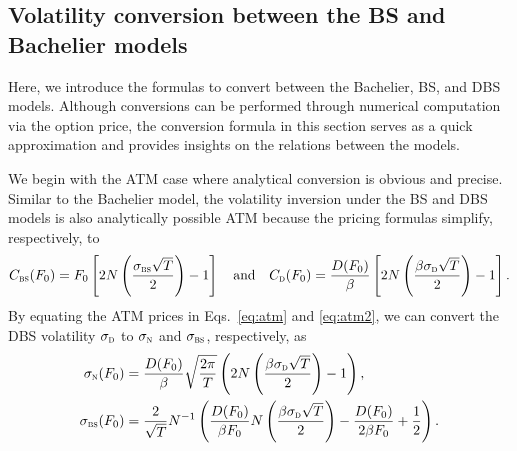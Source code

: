 \documentclass[a4paper,review]{elsarticle}
\newcommand{\qtext}[2][\quad]{#1\text{#2}#1}
\newcommand{\sigman}{\sigma_\textsc{n}}
\newcommand{\sigmad}{\sigma_\textsc{d}}
\newcommand{\sigmabs}{\sigma_\textsc{bs}}
\newcommand{\bs}{\textsc{bs}}
\newcommand{\disp}{\textsc{d}}
\begin{document}
\subsection{Volatility conversion between the BS and Bachelier models} \label{ssec:conversion} \noindent
Here, we introduce the formulas to convert between the Bachelier, BS, and DBS models. Although conversions can be performed through numerical computation via the option price, the conversion formula in this section serves as a quick approximation and provides insights on the relations between the models.

We begin with the ATM case where analytical conversion is obvious and precise. Similar to the Bachelier model, the volatility inversion under the BS and DBS models is also analytically possible ATM because the pricing formulas simplify, respectively, to~\citep[Proposition 3.2]{dimitroff2016lnvsnorm}
\begin{equation} \label{eq:atm2}
C_\bs(F_0) = F_0 \left[ 2 N\left( \frac{\sigmabs\sqrt{T}}{2}\right) -1
\right] \qtext{and}
C_\disp(F_0) = \frac{D(F_0)}{\beta} \left[ 2 N\left( \frac{\beta \sigmad\sqrt{T}}{2}\right) -1
\right].
\end{equation}
By equating the ATM prices in Eqs.~\eqref{eq:atm} and \eqref{eq:atm2}, we can convert the DBS volatility $\sigmad$ to $\sigman$ and $\sigmabs$, respectively, as
\begin{align} 
	\sigman(F_0) &= \frac{D(F_0)}{\beta} \sqrt{\frac{2\pi}{T}} \left( 2 N\left( \frac{\beta \sigmad\sqrt{T}}{2}\right) -1 \right),\label{eq:dbs2n_atm} \\ 
	\sigmabs(F_0) &= \frac{2}{\sqrt{T}}N^{-1}\left( \frac{D(F_0)}{\beta F_0} N\left( \frac{\beta \sigmad\sqrt{T}}{2}\right) - \frac{D(F_0)}{2\beta F_0} + \frac12\right). \label{eq:dbs2bs_atm}
\end{align}
\end{document}
